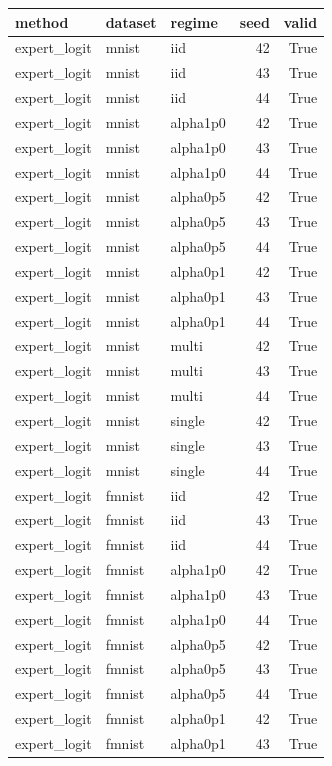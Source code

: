 \begin{tabular}{lllrr}
\toprule
method & dataset & regime & seed & valid \\
\midrule
expert\_logit & mnist & iid & 42 & True \\
expert\_logit & mnist & iid & 43 & True \\
expert\_logit & mnist & iid & 44 & True \\
expert\_logit & mnist & alpha1p0 & 42 & True \\
expert\_logit & mnist & alpha1p0 & 43 & True \\
expert\_logit & mnist & alpha1p0 & 44 & True \\
expert\_logit & mnist & alpha0p5 & 42 & True \\
expert\_logit & mnist & alpha0p5 & 43 & True \\
expert\_logit & mnist & alpha0p5 & 44 & True \\
expert\_logit & mnist & alpha0p1 & 42 & True \\
expert\_logit & mnist & alpha0p1 & 43 & True \\
expert\_logit & mnist & alpha0p1 & 44 & True \\
expert\_logit & mnist & multi & 42 & True \\
expert\_logit & mnist & multi & 43 & True \\
expert\_logit & mnist & multi & 44 & True \\
expert\_logit & mnist & single & 42 & True \\
expert\_logit & mnist & single & 43 & True \\
expert\_logit & mnist & single & 44 & True \\
expert\_logit & fmnist & iid & 42 & True \\
expert\_logit & fmnist & iid & 43 & True \\
expert\_logit & fmnist & iid & 44 & True \\
expert\_logit & fmnist & alpha1p0 & 42 & True \\
expert\_logit & fmnist & alpha1p0 & 43 & True \\
expert\_logit & fmnist & alpha1p0 & 44 & True \\
expert\_logit & fmnist & alpha0p5 & 42 & True \\
expert\_logit & fmnist & alpha0p5 & 43 & True \\
expert\_logit & fmnist & alpha0p5 & 44 & True \\
expert\_logit & fmnist & alpha0p1 & 42 & True \\
expert\_logit & fmnist & alpha0p1 & 43 & True \\

\end{tabular}
